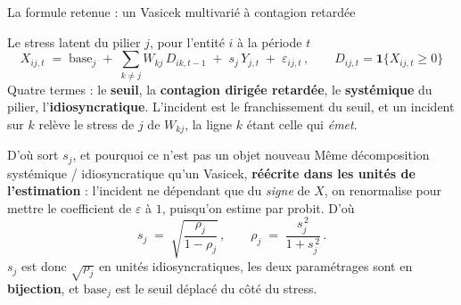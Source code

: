 \documentclass[11pt]{beamer}
\begin{document}
\begin{frame}{La formule retenue : un Vasicek multivarié à contagion retardée}
\scriptsize
\vspace{-1mm}
\begin{block}{Le stress latent du pilier $j$, pour l'entité $i$ à la période $t$}
\[
  X_{ij,t} \;=\; \text{base}_j \;+\; \sum_{k\neq j} W_{kj}\,D_{ik,t-1}
  \;+\; s_j\,Y_{j,t} \;+\; \varepsilon_{ij,t}\,,
  \qquad D_{ij,t} = \mathbf 1\{X_{ij,t} \geq 0\}
\]
Quatre termes : le \textbf{seuil}, la \textbf{contagion dirigée retardée}, le
\textbf{systémique} du pilier, l'\textbf{idiosyncratique}. L'incident est le franchissement du
seuil, et un incident sur $k$ relève le stress de $j$ de $W_{kj}$, la ligne $k$ étant celle qui
\emph{émet}.
\end{block}
\vspace{-1mm}
\begin{block}{D'où sort $s_j$, et pourquoi ce n'est pas un objet nouveau}
Même décomposition systémique / idiosyncratique qu'un Vasicek, \textbf{réécrite dans les unités de
l'estimation} : l'incident ne dépendant que du \emph{signe} de $X$, on renormalise pour mettre le
coefficient de $\varepsilon$ à $1$, puisqu'on estime par probit. D'où
\[
  s_j \;=\; \sqrt{\frac{\rho_j}{1-\rho_j}}\,, \qquad
  \rho_j \;=\; \frac{s_j^{\,2}}{1+s_j^{\,2}}\,.
\]
$s_j$ est donc $\sqrt{\rho_j}$ en unités idiosyncratiques, les deux paramétrages sont en
\textbf{bijection}, et $\text{base}_j$ est le seuil déplacé du côté du stress.
\end{block}
\end{frame}
\end{document}
